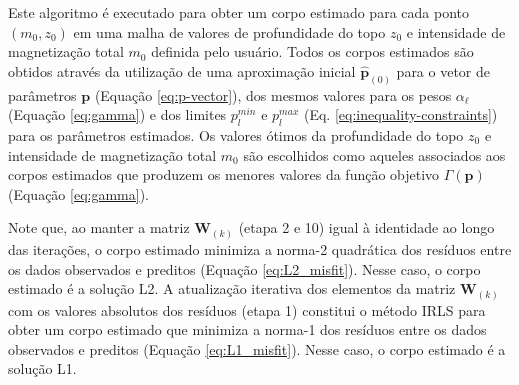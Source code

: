 Este algoritmo é executado para obter um corpo estimado para cada ponto 
$(m_{0}, z_{0})$ em uma malha de valores de profundidade do topo $z_{0}$ e intensidade de magnetização total $m_{0}$ definida pelo usuário. 
Todos os corpos estimados são obtidos através da utilização de uma aproximação inicial $\hat{\mathbf{p}}_{(0)}$ para o vetor de parâmetros
$\mathbf{p}$ (Equação \ref{eq:p-vector}), dos mesmos valores para os pesos
$\alpha_{\ell}$ (Equação \ref{eq:gamma}) e dos limites $p_{l}^{min}$ e 
$p_{l}^{max}$ (Eq. \ref{eq:inequality-constraints}) para os parâmetros estimados.
Os valores ótimos da profundidade do topo $z_{0}$ e intensidade de magnetização total
$m_{0}$ são escolhidos como aqueles associados aos corpos estimados que produzem os menores valores da função objetivo $\Gamma (\mathbf{p})$ (Equação \ref{eq:gamma}).

Note que, ao manter a matriz $\mathbf{W}_{(k)}$ (etapa 2 e 10) igual à identidade ao longo das iterações, o corpo estimado minimiza a norma-2 quadrática dos resíduos entre os dados observados e preditos (Equação \ref{eq:L2_misfit}). 
Nesse caso, o corpo estimado é a solução L2. 
A atualização iterativa dos elementos da matriz $\mathbf{W}_{(k)}$ com os valores absolutos dos resíduos (etapa 1) constitui o método IRLS \citep[][p. 46]{scales_gersztenkorn1988, aster_etal2019} para obter um corpo estimado que minimiza a norma-1 dos resíduos entre os dados observados e preditos 
(Equação \ref{eq:L1_misfit}). Nesse caso, o corpo estimado é a solução L1.

